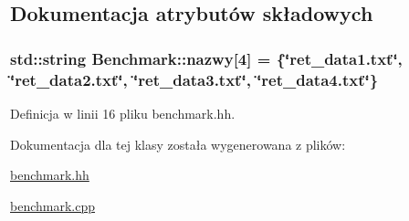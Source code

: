 \subsection{Dokumentacja atrybutów składowych}
\hypertarget{class_benchmark_aee0beda65009e7334d34c5957f78c49a}{
\subsubsection[{nazwy}]{\setlength{\rightskip}{0pt plus 5cm}std\-::string Benchmark\-::nazwy\mbox{[}4\mbox{]} = \{\char`\"{}ret\-\_\-data1.\-txt\char`\"{}, \char`\"{}ret\-\_\-data2.\-txt\char`\"{}, \char`\"{}ret\-\_\-data3.\-txt\char`\"{}, \char`\"{}ret\-\_\-data4.\-txt\char`\"{}\}\hspace{0.3cm}{\ttfamily [private]}}}\label{class_benchmark_aee0beda65009e7334d34c5957f78c49a}


Definicja w linii 16 pliku benchmark.\-hh.



Dokumentacja dla tej klasy została wygenerowana z plików\-:\begin{DoxyCompactItemize}
\item 
\hyperlink{benchmark_8hh}{benchmark.\-hh}\item 
\hyperlink{benchmark_8cpp}{benchmark.\-cpp}\end{DoxyCompactItemize}
